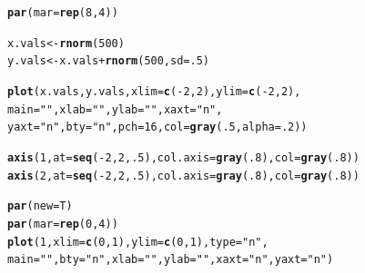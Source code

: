 \documentclass{tufte-book}\usepackage[]{graphicx}\usepackage[]{color}
\makeatletter
\newcommand{\hlnum}[1]{\textcolor[rgb]{0.686,0.059,0.569}{#1}}%
\newcommand{\hlstr}[1]{\textcolor[rgb]{0.192,0.494,0.8}{#1}}%
\newcommand{\hlopt}[1]{\textcolor[rgb]{0,0,0}{#1}}%
\newcommand{\hlstd}[1]{\textcolor[rgb]{0.345,0.345,0.345}{#1}}%
\newcommand{\hlkwb}[1]{\textcolor[rgb]{0.69,0.353,0.396}{#1}}%
\newcommand{\hlkwc}[1]{\textcolor[rgb]{0.333,0.667,0.333}{#1}}%
\newcommand{\hlkwd}[1]{\textcolor[rgb]{0.737,0.353,0.396}{\textbf{#1}}}%
\newenvironment{kframe}{%
 \def\at@end@of@kframe{}%
 \ifinner\ifhmode%
  \def\at@end@of@kframe{\end{minipage}}%
  \begin{minipage}{\columnwidth}%
 \fi\fi%
 \def\FrameCommand##1{\hskip\@totalleftmargin \hskip-\fboxsep
 \colorbox{shadecolor}{##1}\hskip-\fboxsep
     \hskip-\linewidth \hskip-\@totalleftmargin \hskip\columnwidth}%
 \MakeFramed {\advance\hsize-\width
   \@totalleftmargin\z@ \linewidth\hsize
   \@setminipage}}%
 {\par\unskip\endMakeFramed%
 \at@end@of@kframe}
\newenvironment{knitrout}{}{} %
\makeatother
\begin{document}
\begin{marginfigure}
\begin{tiny}
\begin{knitrout}
\color{fgcolor}\begin{kframe}
\begin{alltt}
\hlkwd{par}\hlstd{(}\hlkwc{mar} \hlstd{=} \hlkwd{rep}\hlstd{(}\hlnum{8}\hlstd{,} \hlnum{4}\hlstd{))}

\hlstd{x.vals} \hlkwb{<-} \hlkwd{rnorm}\hlstd{(}\hlnum{500}\hlstd{)}
\hlstd{y.vals} \hlkwb{<-} \hlstd{x.vals} \hlopt{+} \hlkwd{rnorm}\hlstd{(}\hlnum{500}\hlstd{,} \hlkwc{sd} \hlstd{=} \hlnum{.5}\hlstd{)}

\hlkwd{plot}\hlstd{(x.vals, y.vals,} \hlkwc{xlim} \hlstd{=} \hlkwd{c}\hlstd{(}\hlopt{-}\hlnum{2}\hlstd{,} \hlnum{2}\hlstd{),} \hlkwc{ylim} \hlstd{=} \hlkwd{c}\hlstd{(}\hlopt{-}\hlnum{2}\hlstd{,} \hlnum{2}\hlstd{),}
     \hlkwc{main} \hlstd{=} \hlstr{""}\hlstd{,} \hlkwc{xlab} \hlstd{=} \hlstr{""}\hlstd{,} \hlkwc{ylab} \hlstd{=} \hlstr{""}\hlstd{,} \hlkwc{xaxt} \hlstd{=} \hlstr{"n"}\hlstd{,}
     \hlkwc{yaxt} \hlstd{=} \hlstr{"n"}\hlstd{,} \hlkwc{bty} \hlstd{=} \hlstr{"n"}\hlstd{,} \hlkwc{pch} \hlstd{=} \hlnum{16}\hlstd{,} \hlkwc{col} \hlstd{=} \hlkwd{gray}\hlstd{(}\hlnum{.5}\hlstd{,} \hlkwc{alpha} \hlstd{=} \hlnum{.2}\hlstd{))}

\hlkwd{axis}\hlstd{(}\hlnum{1}\hlstd{,} \hlkwc{at} \hlstd{=} \hlkwd{seq}\hlstd{(}\hlopt{-}\hlnum{2}\hlstd{,} \hlnum{2}\hlstd{,} \hlnum{.5}\hlstd{),} \hlkwc{col.axis} \hlstd{=} \hlkwd{gray}\hlstd{(}\hlnum{.8}\hlstd{),} \hlkwc{col} \hlstd{=} \hlkwd{gray}\hlstd{(}\hlnum{.8}\hlstd{))}
\hlkwd{axis}\hlstd{(}\hlnum{2}\hlstd{,} \hlkwc{at} \hlstd{=} \hlkwd{seq}\hlstd{(}\hlopt{-}\hlnum{2}\hlstd{,} \hlnum{2}\hlstd{,} \hlnum{.5}\hlstd{),} \hlkwc{col.axis} \hlstd{=} \hlkwd{gray}\hlstd{(}\hlnum{.8}\hlstd{),} \hlkwc{col} \hlstd{=} \hlkwd{gray}\hlstd{(}\hlnum{.8}\hlstd{))}

\hlkwd{par}\hlstd{(}\hlkwc{new} \hlstd{= T)}
\hlkwd{par}\hlstd{(}\hlkwc{mar} \hlstd{=} \hlkwd{rep}\hlstd{(}\hlnum{0}\hlstd{,} \hlnum{4}\hlstd{))}
\hlkwd{plot}\hlstd{(}\hlnum{1}\hlstd{,} \hlkwc{xlim} \hlstd{=} \hlkwd{c}\hlstd{(}\hlnum{0}\hlstd{,} \hlnum{1}\hlstd{),} \hlkwc{ylim} \hlstd{=} \hlkwd{c}\hlstd{(}\hlnum{0}\hlstd{,} \hlnum{1}\hlstd{),} \hlkwc{type} \hlstd{=}\hlstr{"n"}\hlstd{,}
     \hlkwc{main} \hlstd{=} \hlstr{""}\hlstd{,} \hlkwc{bty} \hlstd{=} \hlstr{"n"}\hlstd{,} \hlkwc{xlab} \hlstd{=} \hlstr{""}\hlstd{,} \hlkwc{ylab} \hlstd{=} \hlstr{""}\hlstd{,} \hlkwc{xaxt} \hlstd{=} \hlstr{"n"}\hlstd{,} \hlkwc{yaxt} \hlstd{=} \hlstr{"n"}\hlstd{)}


\end{alltt}
\end{kframe}
\end{knitrout}
\end{tiny}
\end{marginfigure}
\end{document}
